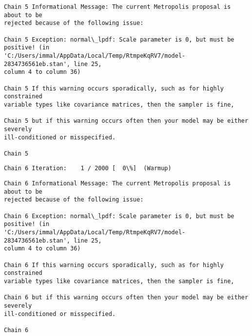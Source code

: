 \documentclass[11pt]{article}
\begin{document}
    \begin{Verbatim}[commandchars=\\\{\}]
Chain 5 Informational Message: The current Metropolis proposal is about to be
rejected because of the following issue:

Chain 5 Exception: normal\_lpdf: Scale parameter is 0, but must be positive! (in
'C:/Users/immal/AppData/Local/Temp/RtmpeKqRV7/model-2834736561eb.stan', line 25,
column 4 to column 36)

Chain 5 If this warning occurs sporadically, such as for highly constrained
variable types like covariance matrices, then the sampler is fine,

Chain 5 but if this warning occurs often then your model may be either severely
ill-conditioned or misspecified.

Chain 5

    \end{Verbatim}

    \begin{Verbatim}[commandchars=\\\{\}]
Chain 6 Iteration:    1 / 2000 [  0\%]  (Warmup)
    \end{Verbatim}

    \begin{Verbatim}[commandchars=\\\{\}]
Chain 6 Informational Message: The current Metropolis proposal is about to be
rejected because of the following issue:

Chain 6 Exception: normal\_lpdf: Scale parameter is 0, but must be positive! (in
'C:/Users/immal/AppData/Local/Temp/RtmpeKqRV7/model-2834736561eb.stan', line 25,
column 4 to column 36)

Chain 6 If this warning occurs sporadically, such as for highly constrained
variable types like covariance matrices, then the sampler is fine,

Chain 6 but if this warning occurs often then your model may be either severely
ill-conditioned or misspecified.

Chain 6

    \end{Verbatim}
\end{document}
